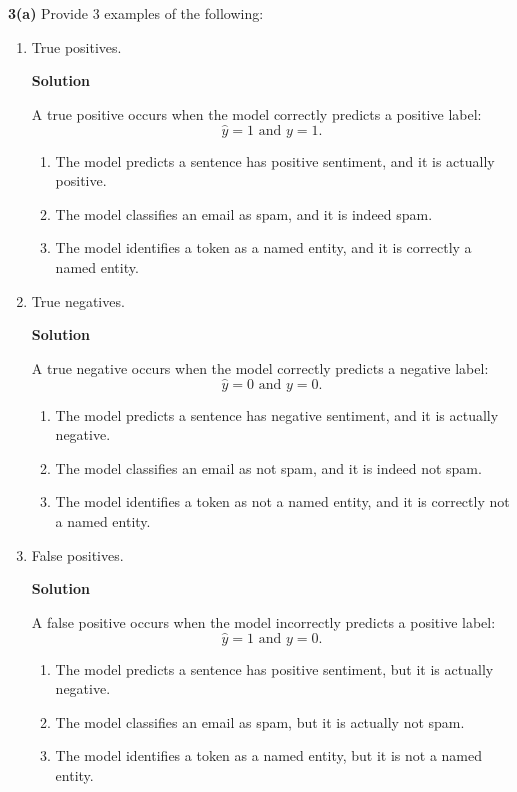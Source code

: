 \documentclass[10pt]{article}
\begin{document}
\textbf{3(a)} Provide 3 examples of the following:
\begin{enumerate}[label=\roman*.]
    \item True positives.
    
    \textbf{Solution}
    
    A true positive occurs when the model correctly predicts a positive label:
    \[
    \hat{y} = 1 \text{ and } y = 1.
    \]
    
    \begin{enumerate}
    	\item The model predicts a sentence has positive sentiment, and it is actually positive.
    	\item The model classifies an email as spam, and it is indeed spam.
    	\item The model identifies a token as a named entity, and it is correctly a named entity.
    \end{enumerate}
    
    \item True negatives.
    
    \textbf{Solution}
    
    A true negative occurs when the model correctly predicts a negative label:
    \[
    \hat{y} = 0 \text{ and } y = 0.
    \]
    
    \begin{enumerate}
    	\item The model predicts a sentence has negative sentiment, and it is actually negative.
    	\item The model classifies an email as not spam, and it is indeed not spam.
    	\item The model identifies a token as not a named entity, and it is correctly not a named entity.
    \end{enumerate}
    
    \item False positives.
    
    \textbf{Solution}
    
    A false positive occurs when the model incorrectly predicts a positive label:
    \[
    \hat{y} = 1 \text{ and } y = 0.
    \]
    
    \begin{enumerate}
    	\item The model predicts a sentence has positive sentiment, but it is actually negative.
    	\item The model classifies an email as spam, but it is actually not spam.
    	\item The model identifies a token as a named entity, but it is not a named entity.
    \end{enumerate}
    

\end{enumerate}
\end{document}
